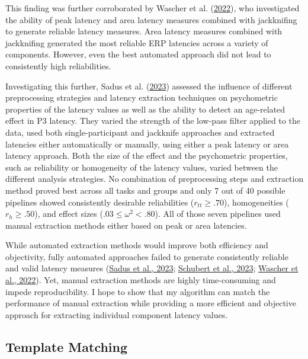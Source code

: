 \documentclass[
  man]{apa7}
\begin{document}
This finding was further corroborated by Wascher et al. (\protect\hyperlink{ref-wascher2022mental}{2022}), who investigated the ability of peak latency and area latency measures combined with jackknifing to generate reliable latency measures. Area latency measures combined with jackknifing generated the most reliable ERP latencies across a variety of components. However, even the best automated approach did not lead to consistently high reliabilities.

Investigating this further, Sadus et al. (\protect\hyperlink{ref-sadus2023multiverse}{2023}) assessed the influence of different preprocessing strategies and latency extraction techniques on psychometric properties of the latency values as well as the ability to detect an age-related effect in P3 latency. They varied the strength of the low-pass filter applied to the data, used both single-participant and jackknife approaches and extracted latencies either automatically or manually, using either a peak latency or area latency approach. Both the size of the effect and the psychometric properties, such as reliability or homogeneity of the latency values, varied between the different analysis strategies. No combination of preprocessing steps and extraction method proved best across all tasks and groups and only 7 out of 40 possible pipelines showed consistently desirable reliabilities (\(r_{tt} \ge .70\)), homogeneities (\(r_{h} \ge .50\)), and effect sizes (\(.03 \le \omega^2 <.80\)). All of those seven pipelines used manual extraction methods either based on peak or area latencies.

While automated extraction methods would improve both efficiency and objectivity, fully automated approaches failed to generate consistently reliable and valid latency measures (\protect\hyperlink{ref-sadus2023multiverse}{Sadus et al., 2023}; \protect\hyperlink{ref-schubert2023robust}{Schubert et al., 2023}; \protect\hyperlink{ref-wascher2022mental}{Wascher et al., 2022}). Yet, manual extraction methods are highly time-consuming and impede reproducibility. I hope to show that my algorithm can match the performance of manual extraction while providing a more efficient and objective approach for extracting individual component latency values.

\hypertarget{template-matching}{%
\subsection{Template Matching}\label{template-matching}}
\end{document}
